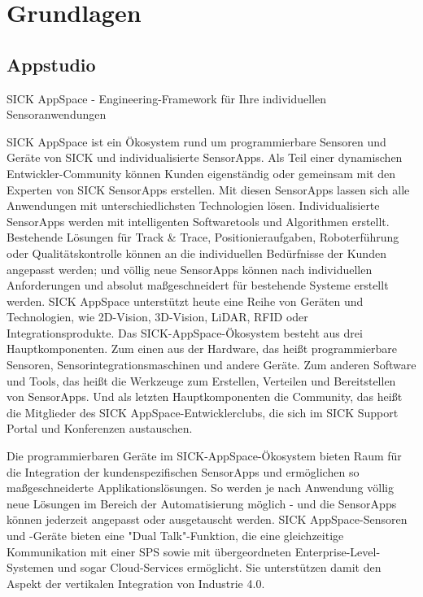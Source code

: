 


\chapter{Grundlagen}

\section{Appstudio}
SICK AppSpace - Engineering-Framework für Ihre individuellen Sensoranwendungen

SICK AppSpace ist ein Ökosystem rund um programmierbare Sensoren und Geräte von SICK und individualisierte SensorApps. Als Teil einer dynamischen Entwickler-Community können Kunden eigenständig oder gemeinsam mit den Experten von SICK SensorApps erstellen. Mit diesen SensorApps lassen sich alle Anwendungen mit unterschiedlichsten Technologien lösen. Individualisierte SensorApps werden mit intelligenten Softwaretools und Algorithmen erstellt. Bestehende Lösungen für Track & Trace, Positionieraufgaben, Roboterführung oder Qualitätskontrolle können an die individuellen Bedürfnisse der Kunden angepasst werden; und völlig neue SensorApps können nach individuellen Anforderungen und absolut maßgeschneidert für bestehende Systeme erstellt werden. SICK AppSpace unterstützt heute eine Reihe von Geräten und Technologien, wie 2D-Vision, 3D-Vision, LiDAR, RFID oder Integrationsprodukte. Das SICK-AppSpace-Ökosystem besteht aus drei Hauptkomponenten. Zum einen aus der Hardware, das heißt programmierbare Sensoren, Sensorintegrationsmaschinen und andere Geräte. Zum anderen Software und Tools, das heißt die Werkzeuge zum Erstellen, Verteilen und Bereitstellen von SensorApps. Und als letzten Hauptkomponenten die Community, das heißt die Mitglieder des SICK AppSpace-Entwicklerclubs, die sich im SICK Support Portal und Konferenzen austauschen.

Die programmierbaren Geräte im SICK-AppSpace-Ökosystem bieten Raum für die Integration der kundenspezifischen SensorApps und ermöglichen so maßgeschneiderte Applikationslösungen. So werden je nach Anwendung völlig neue Lösungen im Bereich der Automatisierung möglich - und die SensorApps können jederzeit angepasst oder ausgetauscht werden. SICK AppSpace-Sensoren und -Geräte bieten eine "Dual Talk"-Funktion, die eine gleichzeitige Kommunikation mit einer SPS sowie mit übergeordneten Enterprise-Level-Systemen und sogar Cloud-Services ermöglicht. Sie unterstützen damit den Aspekt der vertikalen Integration von Industrie 4.0.

